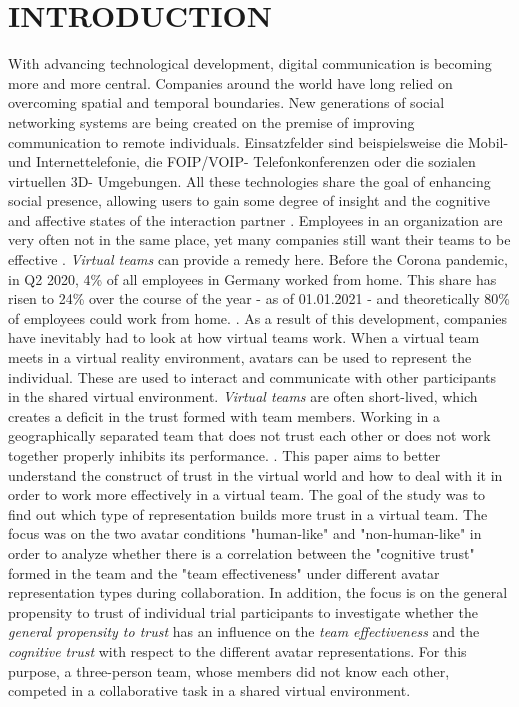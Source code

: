 \documentclass[sigchi]{acmart}
\begin{document}
\maketitle

\section{INTRODUCTION}
With advancing technological development, digital communication is becoming more and more central. Companies around the world have long relied on overcoming spatial and temporal boundaries.
New generations of social networking systems are being created on the premise of improving communication to remote individuals.
Einsatzfelder sind beispielsweise die Mobil- und Internettelefonie, die FOIP/VOIP- Telefonkonferenzen oder die sozialen virtuellen 3D- Umgebungen.
All these technologies share the goal of enhancing social presence, allowing users to gain some degree of insight and the cognitive and affective states of the interaction partner \citep[S. 407–447]{biocca2001plugging}.
Employees in an organization are very often not in the same place, yet many companies still want their teams to be effective \citep[S. 791-792]{jarvenpaa1999communication}. \textit{Virtual teams} can provide a remedy here. 
Before the Corona pandemic, in Q2 2020, 4\% of all employees in Germany worked from home. This share has risen to 24\% over the course of the year - as of 01.01.2021 - and theoretically 80\% of employees could work from home. \citep{statistaCorona2020}. As a result of this development, companies have inevitably had to look at how virtual teams work.
When a virtual team meets in a virtual reality environment, avatars can be used to represent the individual. These are used to interact and communicate with other participants in the shared virtual environment.
\textit{Virtual teams} are often short-lived, which creates a deficit in the trust formed with team members.
Working in a geographically separated team that does not trust each other or does not work together properly inhibits its performance. \citep[S. 98-107]{huang1998supporting} \citep[S. 399-417]{turoff1993distributed}. This paper aims to better understand the construct of trust in the virtual world and how to deal with it in order to work more effectively in a virtual team.
The goal of the study was to find out which type of representation builds more trust in a virtual team. The focus was on the two avatar conditions "human-like" and "non-human-like" in order to analyze whether there is a correlation between the "cognitive trust" formed in the team and the "team effectiveness" under different avatar representation types during collaboration.
In addition, the focus is on the general propensity to trust of individual trial participants to investigate whether the \textit{general propensity to trust} has an influence on the \textit{team effectiveness} and the \textit{cognitive trust} with respect to the different avatar representations. For this purpose, a three-person team, whose members did not know each other, competed in a collaborative task in a shared virtual environment.
\end{document}
